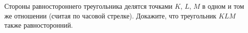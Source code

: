 Стороны  равностороннего  треугольника  делятся  точками $K$, $L$, $M$ в одном и том же отношении (считая по часовой стрелке).  Докажите,  что  треугольник $KLM$  также  равносторонний.
